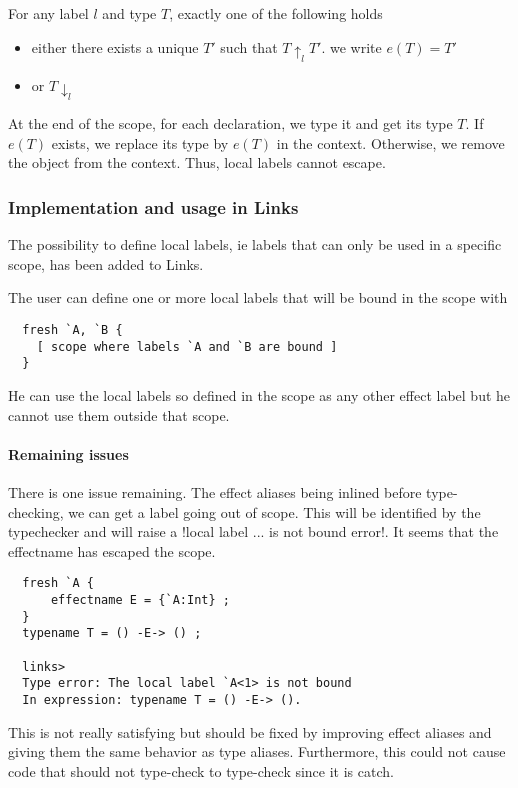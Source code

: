 \documentclass[11pt, nonacm=true, language=french, language=english]{acmart}
\begin{document}
\begin{thm}
  For any label $l$ and type $T$, exactly one of the following holds
  \begin{itemize}
    \item either there exists a unique $T'$ such that $T\uparrow_{l}T'$. we write $e(T) = T'$
    \item or $T\downarrow_{l}$
  \end{itemize}
\end{thm}

At the end of the scope, for each declaration, we type it and get its type $T$. If $e(T)$ exists, we replace its type by $e(T)$ in the context. Otherwise, we remove the object from the context.
Thus, local labels cannot escape.

\subsubsection{Implementation and usage in Links}
\label{sec:impl-usage-links}

The possibility to define local labels, ie labels that can only be used in a specific scope, has been added to Links.

The user can define one or more local labels that will be bound in the scope with
\begin{lstlisting}
  fresh `A, `B {
    [ scope where labels `A and `B are bound ]
  }
\end{lstlisting}

He can use the local labels so defined in the scope as any other effect label but he cannot use them outside that scope.

\paragraph{Remaining issues}
There is one issue remaining. The effect aliases being inlined before type-checking, we can get a label going out of scope. This will be identified by the typechecker and will raise a !local label ... is not bound error!. It seems that the effectname has escaped the scope.
\begin{lstlisting}
  fresh `A {
      effectname E = {`A:Int} ;
  }
  typename T = () -E-> () ;

  links>
  Type error: The local label `A<1> is not bound
  In expression: typename T = () -E-> ().
\end{lstlisting}
This is not really satisfying but should be fixed by improving effect aliases and giving them the same behavior as type aliases. Furthermore, this could not cause code that should not type-check to type-check since it is catch.
\end{document}
